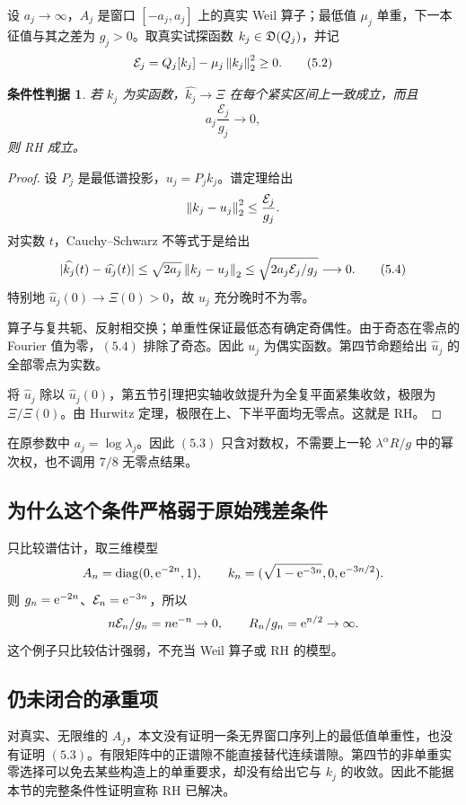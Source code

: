\documentclass[UTF8,fontset=none,11pt,a4paper]{ctexart}
\newtheorem*{criterion}{条件性判据}
\begin{document}
设 $a_j\to\infty$，$A_j$ 是窗口 $[-a_j,a_j]$ 上的真实 Weil 算子；最低值 $\mu_j$ 单重，下一本征值与其之差为 $g_j>0$。取真实试探函数 $k_j\in\mathfrak D(Q_j)$，并记
\[
 \mathcal E_j=Q_j[k_j]-\mu_j\left\lVert k_j\right\rVert_2^2\ge0. \tag{5.2}
\]
\begin{criterion}
若 $k_j$ 为实函数，$\widehat{k_j}\to\Xi$ 在每个紧实区间上一致成立，而且
\[
 \boxed{\displaystyle a_j\frac{\mathcal E_j}{g_j}\longrightarrow0,} \tag{5.3}
\]
则 RH 成立。
\end{criterion}
\begin{proof}
设 $P_j$ 是最低谱投影，$u_j=P_jk_j$。谱定理给出
\[
 \left\lVert k_j-u_j\right\rVert_2^2\le\frac{\mathcal E_j}{g_j}.
\]
对实数 $t$，Cauchy--Schwarz 不等式于是给出
\[
 |\widehat{k_j}(t)-\widehat{u_j}(t)|
 \le\sqrt{2a_j}\left\lVert k_j-u_j\right\rVert_2
 \le\sqrt{2a_j\mathcal E_j/g_j}\longrightarrow0. \tag{5.4}
\]
特别地 $\widehat u_j(0)\to\Xi(0)>0$，故 $u_j$ 充分晚时不为零。

算子与复共轭、反射相交换；单重性保证最低态有确定奇偶性。由于奇态在零点的 Fourier 值为零，$(5.4)$ 排除了奇态。因此 $u_j$ 为偶实函数。第四节命题给出 $\widehat u_j$ 的全部零点为实数。

将 $\widehat u_j$ 除以 $\widehat u_j(0)$，第五节引理把实轴收敛提升为全复平面紧集收敛，极限为 $\Xi/\Xi(0)$。由 Hurwitz 定理，极限在上、下半平面均无零点。这就是 RH。
\end{proof}

在原参数中 $a_j=\log\lambda_j$。因此 $(5.3)$ 只含对数权，不需要上一轮 $\lambda^\alpha R/g$ 中的幂次权，也不调用 $7/8$ 无零点结果。

\subsection*{为什么这个条件严格弱于原始残差条件}
只比较谱估计，取三维模型
\[
 A_n=\operatorname{diag}(0,\mathrm e^{-2n},1),\qquad
 k_n=(\sqrt{1-\mathrm e^{-3n}},0,\mathrm e^{-3n/2}).
\]
则 $g_n=\mathrm e^{-2n}$、$\mathcal E_n=\mathrm e^{-3n}$，所以
\[
 n\mathcal E_n/g_n=n\mathrm e^{-n}\to0,
 \qquad R_n/g_n=\mathrm e^{n/2}\to\infty.
\]
这个例子只比较估计强弱，不充当 Weil 算子或 RH 的模型。

\subsection*{仍未闭合的承重项}
对真实、无限维的 $A_j$，本文没有证明一条无界窗口序列上的最低值单重性，也没有证明 $(5.3)$。有限矩阵中的正谱隙不能直接替代连续谱隙。第四节的非单重实零选择可以免去某些构造上的单重要求，却没有给出它与 $k_j$ 的收敛。因此不能据本节的完整条件性证明宣称 RH 已解决。
\end{document}

